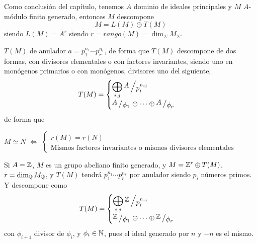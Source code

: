 \begin{cor}
    Como conclusi\'on del cap\'itulo, tenemos $A$ dominio de ideales principales y $M$ $A$-m\'odulo finito generado, entonces $M$ descompone
    $$M = L(M) \oplus T(M)$$
    siendo $L(M) = A^r$ siendo $r=rango(M) = \dim_{\Sigma} M_{\Sigma}$.

    $T(M)$ de anulador $a=p_1^{n_1} \cdots p_r^{n_r}$, de forma que $T(M)$ descompone de dos formas, con divisores elementales o con factores invariantes, siendo uno en mon\'ogenos primarios o con mon\'ogenos, divisores uno del siguiente,
    $$T(M) = \begin{cases}
        \displaystyle \bigoplus_{i,j} \modulo{A}{p_i^{n_{ij}}} \\ \modulo{A}{\phi_1} \oplus \cdots \oplus \modulo{A}{\phi_r}
    \end{cases}$$
    de forma que
\end{cor}
\begin{teo}
    $M \simeq N$ $\iff$ $\begin{cases}
        r(M) = r(N) \\ \text{Mismos factores invariantes o mismos divisores elementales}
    \end{cases}$
\end{teo}
\begin{ejem}
    Si $A=\mathbb{Z}$, $M$ es un grupo abeliano finito generado, y $M = \mathbb{Z}^r \oplus T(M)$. $r = \dim_{\mathbb{Q}} M_{\mathbb{Q}}$, y $T(M)$ tendr\'a $p_1^{n_1} \cdots p_r^{n_r}$ por anulador siendo $p_i$ n\'umeros primos. Y descompone como 
    $$T(M) = \begin{cases}
        \displaystyle \bigoplus_{i,j} \modulo{\bb Z}{p_i^{n_{ij}}} \\ \modulo{\bb Z}{\phi_1} \oplus \cdots \oplus \modulo{\bb Z}{ \phi_r}
    \end{cases}$$
    con $\phi_{i+1}$ divisor de $\phi_i$, y $\phi_i \in \mathbb{N}$, pues el ideal generado por $n$ y $-n$ es el mismo.
\end{ejem}


